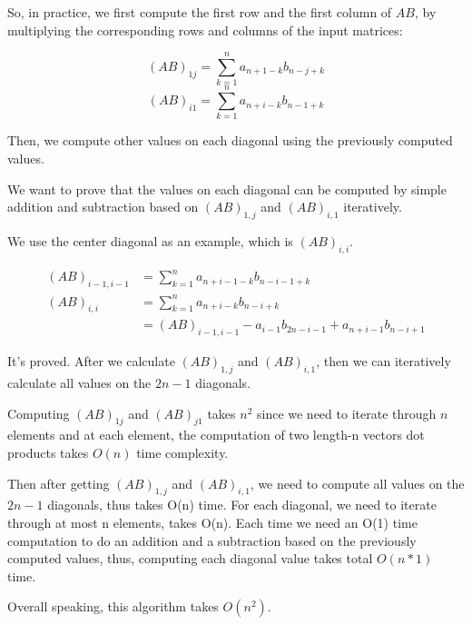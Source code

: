 So, in practice, we first compute the first row and the first column of $AB$, by multiplying the corresponding rows and columns of the input matrices:

$$(AB)_{1 j}= \sum_{k=1}^{n}{a_{n+1-k}b_{n-j+k}}$$
$$(AB)_{i 1}= \sum_{k=1}^{n}{a_{n+i-k}b_{n-1+k}}$$

Then, we compute other values on each diagonal using the previously computed values. 


We want to prove that the values on each diagonal can be computed by simple addition and subtraction based on $(AB)_{1,j}$ and $(AB)_{i,1}$ iteratively.

We use the center diagonal as an example, which is $(AB)_{i,i}$.

$$
\begin{aligned}
(AB)_{i-1,i-1} &=  \sum_{k=1}^{n}{a_{n+i-1-k}b_{n-i-1+k}}\\
(AB)_{i,i} &=  \sum_{k=1}^{n}{a_{n+i-k}b_{n-i+k}}\\
&= (AB)_{i-1,i-1} - {a_{i-1}b_{2n-i-1}}+ {a_{n+i-1}b_{n-i+1}} 
\end{aligned}
$$

It's proved. After we calculate $(AB)_{1,j}$ and $(AB)_{i,1}$, then we can iteratively calculate all values on the $2n-1$ diagonals.


Computing $(AB)_{1 j}$ and $(AB)_{j 1}$ takes $n^2$ since we need to iterate through $n$ elements and at each element, the computation of two length-n vectors dot products takes $O(n)$ time complexity.

Then after getting $(AB)_{1,j}$ and $(AB)_{i,1}$, we need to compute all values on the $2n-1$ diagonals, thus takes O(n) time. For each diagonal, we need to iterate through at most n elements, takes O(n). Each time we need an O(1) time computation to do an addition and a subtraction based on the previously computed values, thus, computing each diagonal value takes total $O(n*1)$ time.

Overall speaking, this algorithm takes $O(n^2)$.





